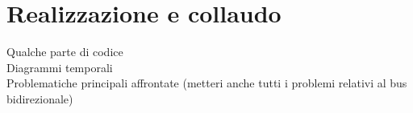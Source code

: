 \clearpage{\pagestyle{empty}\cleardoublepage}

\chapter{Realizzazione e collaudo}


Qualche parte di codice \\

Diagrammi temporali \\

Problematiche principali affrontate (metteri anche tutti i problemi relativi al bus bidirezionale)\\

